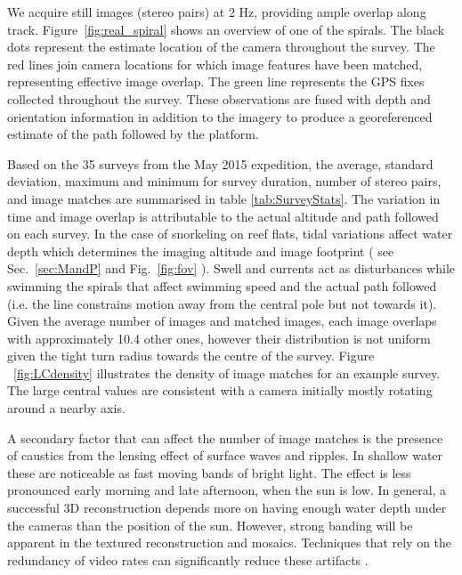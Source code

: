 We acquire still images (stereo pairs) at 2 Hz, providing ample overlap along track. Figure~\ref{fig:real_spiral} shows an overview of one of the spirals.  The black dots represent the estimate location of the camera throughout the survey.  The red lines join camera locations for which image features have been matched, representing effective image overlap.  The green line represents the GPS fixes collected throughout the survey.  These observations are fused with depth and orientation information in addition to the imagery to produce a georeferenced estimate of the path followed by the platform.

Based on the 35 surveys from the May 2015 expedition, the average, standard deviation, maximum and minimum for survey duration, number of stereo pairs, and image matches are summarised in table \ref{tab:SurveyStats}. The variation in time and image overlap is attributable to the actual altitude and path followed on each survey. In the case of snorkeling on reef flats, tidal variations affect water depth which determines the imaging altitude and image footprint ( see Sec.~\ref{sec:MandP} and Fig.~\ref{fig:fov} ). Swell and currents act as disturbances while swimming the spirals that affect swimming speed and the actual path followed (i.e. the line constrains motion away from the central pole but not towards it). Given the average number of images and matched images, each image overlaps with approximately 10.4 other ones, however their distribution is not uniform given the tight turn radius towards the centre of the survey. Figure ~\ref{fig:LCdensity} illustrates the density of image matches for an example survey. The large central values are consistent with a camera initially mostly rotating around a nearby axis. 

A secondary factor that can affect the number of image matches is the presence of caustics from the lensing effect of surface waves and ripples. In shallow water these are noticeable as fast moving bands of bright light. The effect is less pronounced early morning and late afternoon, when the sun is low. In general, a successful 3D reconstruction depends more on having enough water depth under the cameras than the position of the sun. However, strong banding will be apparent in the textured reconstruction and mosaics. Techniques that rely on the redundancy of video rates can significantly reduce these artifacts \cite{Gracias_2008}.


